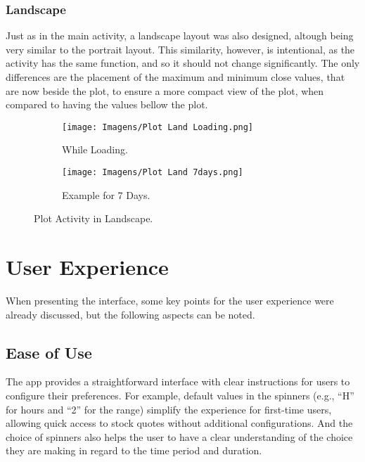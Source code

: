 \documentclass{article}
\begin{document}
\subsubsection{Landscape}
Just as in the main activity, a landscape layout was also designed, altough being very similar to the portrait layout.
This similarity, however, is intentional, as the activity has the same function, and so it should not change significantly.
The only differences are the placement of the maximum and minimum close values, that are now beside the plot, to ensure a more compact view of the plot, when compared to having the values bellow the plot.

\begin{figure}[ht]
    \centering
    \begin{subfigure}[t]{0.8\textwidth}
        \centering
        \texttt{[image: Imagens/Plot Land Loading.png]}
        \caption{While Loading.}
        \label{fig:plot land loading}
    \end{subfigure}
    
    \vspace{1em} 

    \begin{subfigure}[t]{0.8\textwidth} 
        \centering
        \texttt{[image: Imagens/Plot Land 7days.png]}
        \caption{Example for 7 Days.}
        \label{fig:plot land 7 days}
    \end{subfigure}

    \caption{Plot Activity in Landscape.}
    \label{fig:plot land}
\end{figure}

\section{User Experience}
When presenting the interface, some key points for the user experience were already discussed, but the following aspects can be noted.

\subsection{Ease of Use}
The app provides a straightforward interface with clear instructions for users to configure their preferences.
For example, default values in the spinners (e.g., “H” for hours and “2” for the range) simplify the experience for first-time users, allowing quick access to stock quotes without additional configurations.
And the choice of spinners also helps the user to have a clear understanding of the choice they are making in regard to the time period and duration.
\end{document}
